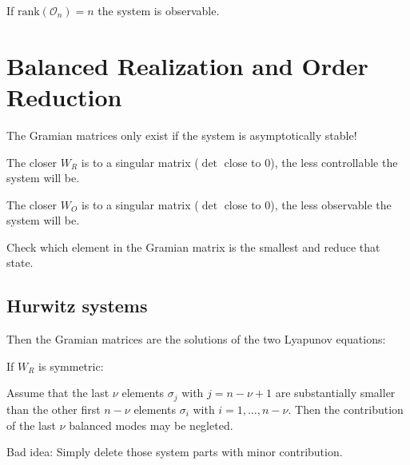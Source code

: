 \documentclass[10pt,a4paper]{scrartcl}
\begin{document}
\begin{multicols*}{3}
If $\text{rank}(\mathcal{O}_n)=n$ the system is observable.

\vfill

\section{Balanced Realization and Order Reduction}

The Gramian matrices only exist if the system is asymptotically stable!


The closer $W_R$ is to a singular matrix ($\det$ close to 0), the less controllable the system will be.


The closer $W_O$ is to a singular matrix ($\det$ close to 0), the less observable the system will be.

\dahe Check which element in the Gramian matrix is the smallest and reduce that state.

\columnbreak

\subsection{Hurwitz systems}


Then the Gramian matrices are the solutions of the two Lyapunov equations:


If $W_R$ is symmetric:



Assume that the last $\nu$ elements $\sigma_j$ with $j=n-\nu+1$ are substantially smaller than the other first $n-\nu$ elements $\sigma_i$ with $i=1,\ldots, n-\nu$. Then the contribution of the last $\nu$ balanced modes may be negleted.

\finn

Bad idea: Simply delete those system parts with minor contribution.


\end{multicols*}
\end{document}
